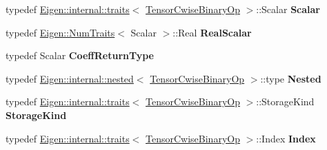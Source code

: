 \begin{DoxyCompactItemize}
\mbox{\label{class_eigen_1_1_tensor_cwise_binary_op_ab6feb8d00c245ae3633494dcbb4623de}} 
typedef \hyperlink{struct_eigen_1_1internal_1_1traits}{Eigen\+::internal\+::traits}$<$ \hyperlink{class_eigen_1_1_tensor_cwise_binary_op}{Tensor\+Cwise\+Binary\+Op} $>$\+::Scalar {\bfseries Scalar}
\item 
\mbox{\label{class_eigen_1_1_tensor_cwise_binary_op_aeb5ff517e3267f7009d2cef81cd700ec}} 
typedef \hyperlink{group___core___module_struct_eigen_1_1_num_traits}{Eigen\+::\+Num\+Traits}$<$ Scalar $>$\+::Real {\bfseries Real\+Scalar}
\item 
\mbox{\label{class_eigen_1_1_tensor_cwise_binary_op_a7440731924efdd5a6f24654004be74f1}} 
typedef Scalar {\bfseries Coeff\+Return\+Type}
\item 
\mbox{\label{class_eigen_1_1_tensor_cwise_binary_op_a9226f2d49617be16f19110581407fdd3}} 
typedef \hyperlink{struct_eigen_1_1internal_1_1nested}{Eigen\+::internal\+::nested}$<$ \hyperlink{class_eigen_1_1_tensor_cwise_binary_op}{Tensor\+Cwise\+Binary\+Op} $>$\+::type {\bfseries Nested}
\item 
\mbox{\label{class_eigen_1_1_tensor_cwise_binary_op_ac7da83ffbf17a0e1e5d9582707768962}} 
typedef \hyperlink{struct_eigen_1_1internal_1_1traits}{Eigen\+::internal\+::traits}$<$ \hyperlink{class_eigen_1_1_tensor_cwise_binary_op}{Tensor\+Cwise\+Binary\+Op} $>$\+::Storage\+Kind {\bfseries Storage\+Kind}
\item 
\mbox{\label{class_eigen_1_1_tensor_cwise_binary_op_a06da4fbdebb9959b639ba763e887706d}} 
typedef \hyperlink{struct_eigen_1_1internal_1_1traits}{Eigen\+::internal\+::traits}$<$ \hyperlink{class_eigen_1_1_tensor_cwise_binary_op}{Tensor\+Cwise\+Binary\+Op} $>$\+::Index {\bfseries Index}
\end{DoxyCompactItemize}
